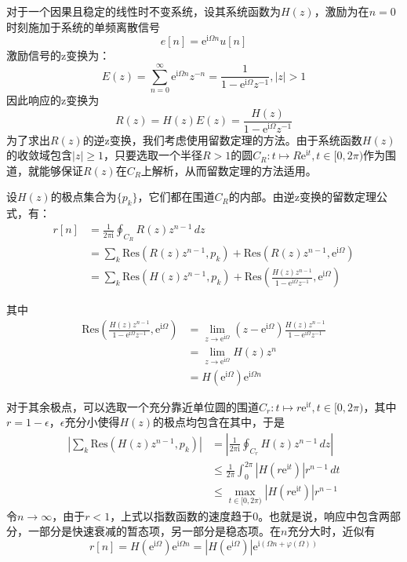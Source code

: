\documentclass{ctexbook}
\begin{document}
\begin{example}
    对于一个因果且稳定的线性时不变系统，设其系统函数为$H(z)$，激励为在$n=0$时刻施加于系统的单频离散信号
    $$e[n]=\mathrm{e}^{\mathrm{i}\Omega n}u[n]$$
    激励信号的z变换为：
    $$E(z)=\sum_{n=0}^{\infty}\mathrm{e}^{\mathrm{i}\Omega n}z^{-n}=\frac{1}{1-\mathrm{e}^{\mathrm{i}\Omega}z^{-1}},|z|>1$$
    因此响应的z变换为
    $$R(z)=H(z)E(z)=\frac{H(z)}{1-\mathrm{e}^{\mathrm{i}\Omega}z^{-1}}$$
    为了求出$R(z)$的逆z变换，我们考虑使用留数定理的方法。由于系统函数$H(z)$的收敛域包含$|z|\geq 1$，只要选取一个半径$R>1$的圆$C_R:t\mapsto R\mathrm{e}^{\mathrm{i}t},t\in[0,2\pi)$作为围道，就能够保证$R(z)$在$C_R$上解析，从而留数定理的方法适用。

    设$H(z)$的极点集合为$\{p_k\}$，它们都在围道$C_R$的内部。由逆z变换的留数定理公式，有：\begin{align*}
        r[n]&=\frac{1}{2\pi\mathrm{i}}\oint_{C_R}R(z)z^{n-1}\,dz\\
        &=\sum_{k}\text{Res}(R(z)z^{n-1},p_k)+\text{Res}(R(z)z^{n-1},\mathrm{e}^{\mathrm{i}\Omega})\\
        &=\sum_{k}\text{Res}(H(z)z^{n-1},p_k)+\text{Res}\left(\frac{H(z)z^{n-1}}{1-\mathrm{e}^{\mathrm{i}\Omega}z^{-1}},\mathrm{e}^{\mathrm{i}\Omega}\right)
    \end{align*}

    其中\begin{align*}
        \text{Res}\left(\frac{H(z)z^{n-1}}{1-\mathrm{e}^{\mathrm{i}\Omega}z^{-1}},\mathrm{e}^{\mathrm{i}\Omega}\right)&=\lim_{z\to \mathrm{e}^{\mathrm{i}\Omega}}(z-\mathrm{e}^{\mathrm{i}\Omega})\frac{H(z)z^{n-1}}{1-\mathrm{e}^{\mathrm{i}\Omega}z^{-1}}\\
        &=\lim_{z\to \mathrm{e}^{\mathrm{i}\Omega}}H(z)z^n\\
        &=H(\mathrm{e}^{\mathrm{i}\Omega})\mathrm{e}^{\mathrm{i}\Omega n}
    \end{align*}

    对于其余极点，可以选取一个充分靠近单位圆的围道$C_r:t\mapsto r\mathrm{e}^{\mathrm{i}t},t\in[0,2\pi)$，其中$r=1-\epsilon$，$\epsilon$充分小使得$H(z)$的极点均包含在其中，于是\begin{align*}
        \left|\sum_{k}\text{Res}(H(z)z^{n-1},p_k)\right|&=\left|\frac{1}{2\pi\mathrm{i}}\oint_{C_r}H(z)z^{n-1}\,dz\right|\\
        &\leq \frac{1}{2\pi}\int_{0}^{2\pi}|H(r\mathrm{e}^{\mathrm{i}t})|r^{n-1}\,dt\\
        &\leq \max_{t\in[0,2\pi)}|H(r\mathrm{e}^{\mathrm{i}t})|r^{n-1}
    \end{align*}
    令$n\to\infty$，由于$r<1$，上式以指数函数的速度趋于$0$。也就是说，响应中包含两部分，一部分是快速衰减的暂态项，另一部分是稳态项。在$n$充分大时，近似有
    $$r[n]=H(\mathrm{e}^{\mathrm{i}\Omega})\mathrm{e}^{\mathrm{i}\Omega n}=|H(\mathrm{e}^{\mathrm{i}\Omega})|\mathrm{e}^{\mathrm{i}(\Omega n+\varphi(\Omega))}$$


\end{example}
\end{document}
